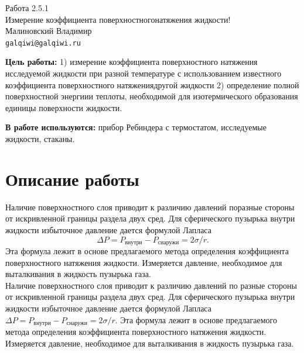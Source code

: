 
\usepackage{booktabs}



\begin{center}
  \LARGE{Работа 2.5.1}\\[0.2cm]
  \LARGE{Измерение коэффициента поверхностногонатяжения жидкости!}\\[0.2cm]
  \large{Малиновский Владимир}\\[0.2cm]
  \normalsize{\texttt{galqiwi@galqiwi.ru}}
\end{center}

\textbf{Цель работы:} 1) измерение коэффициента поверхностного натяжения исследуемой жидкости при разной температуре с использованием известного коэффициента поверхностного натяжениядругой жидкости 2) определение полной поверхностной энергиии теплоты, необходимой для изотермического образования единицы поверхности жидкости.

\textbf{В работе используются:} прибор Ребиндера с термостатом, исследуемые жидкости, стаканы.

\section*{Описание работы}

Наличие поверхностного слоя приводит к различию давлений поразные стороны от искривленной границы раздела двух сред. Для сферического пузырька внутри жидкости избыточное давление дается формулой Лапласа
$$\Delta P = P_\text{внутри}-P_\text{снаружи}=2\sigma/r.$$
Эта формула лежит в основе предлагаемого метода определения коэффициента поверхностного натяжения жидкости. Измеряется давление, необходимое для выталкивания в жидкость пузырька газа.\\

Наличие поверхностного слоя приводит к различию давлений по разные стороны от искривленной границы раздела двух сред. Для сферического пузырька внутри жидкости избыточное давление дается формулой Лапласа $\Delta P = P_\text{внутри}-P_\text{снаружи}=2\sigma/r$. Эта формула лежит в основе предлагаемого метода определения коэффициента поверхностного натяжения жидкости. Измеряется давление, необходимое для выталкивания в жидкость пузырька газа.

